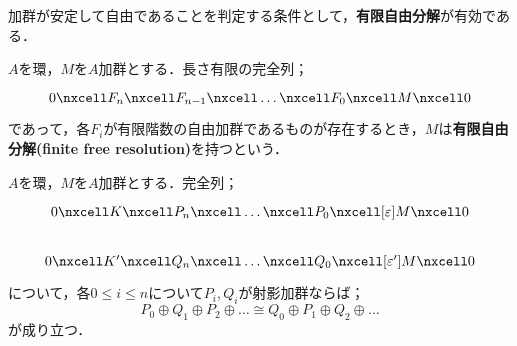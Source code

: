 加群が安定して自由であることを判定する条件として，\textbf{有限自由分解}が有効である．
\begin{defi}[有限自由分解]
	$A$を環，$M$を$A$加群とする．長さ有限の完全列；
	\[\begin{tikzcd}
		0\nxcell F_n\nxcell F_{n-1}\nxcell\dots\nxcell F_0\nxcell M\nxcell 0
	\end{tikzcd}\]
	であって，各$F_i$が有限階数の自由加群であるものが存在するとき，$M$は\textbf{有限自由分解(finite free resolution)}を持つという．
\end{defi}

\begin{lem}[Schanuelの補題]
	$A$を環，$M$を$A$加群とする．完全列；
	\[\begin{tikzcd}
		0\nxcell K\nxcell P_n\nxcell\dots\nxcell P_0\nxcell[\varepsilon] M\nxcell0\\
		0\nxcell K'\nxcell Q_n\nxcell\dots\nxcell Q_0\nxcell[\varepsilon'] M\nxcell0
	\end{tikzcd}\]
	について，各$0\leq i\leq n$について$P_i,Q_i$が射影加群ならば；
	\[P_0\oplus Q_1\oplus P_2\oplus\dots\cong Q_0\oplus P_1\oplus Q_2\oplus\dots\]
	が成り立つ．
\end{lem}

